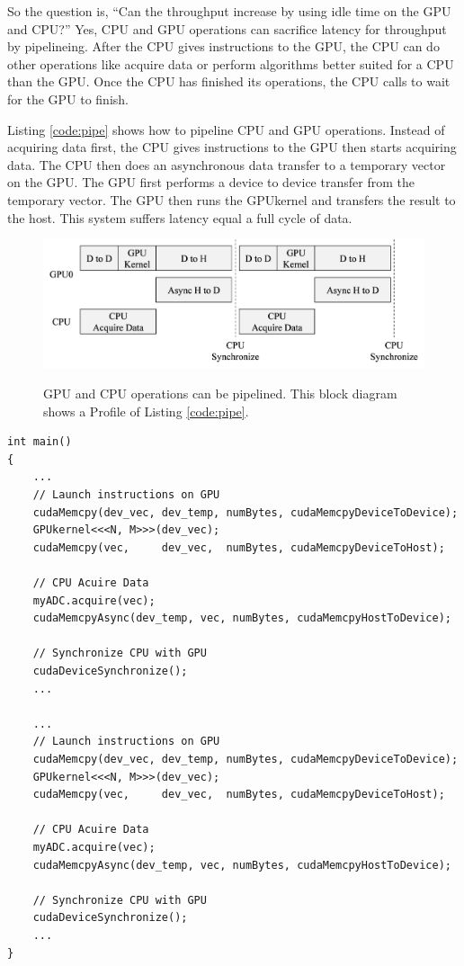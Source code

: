 So the question is, ``Can the throughput increase by using idle time on the GPU and CPU?''
Yes, CPU and GPU operations can sacrifice latency for throughput by pipelineing.
After the CPU gives instructions to the GPU, the CPU can do other operations like acquire data or perform algorithms better suited for a CPU than the GPU.
Once the CPU has finished its operations, the CPU calls to wait for the GPU to finish.

Listing \ref{code:pipe} shows how to pipeline CPU and GPU operations.
Instead of acquiring data first, the CPU gives instructions to the GPU then starts acquiring data.
The CPU then does an asynchronous data transfer to a temporary vector on the GPU.
The GPU first performs a device to device transfer from the temporary vector.
The GPU then runs the GPUkernel and transfers the result to the host.
This system suffers latency equal a full cycle of data.
\begin{figure}
	\caption{GPU and CPU operations can be pipelined. This block diagram shows a Profile of Listing \ref{code:pipe}.}
	\centering\includegraphics[width=9.97in/100*55]{figures/gpu_intro/concurrentCPU_blocking.pdf}
	\label{fig:concurrentCPU_blocking}
\end{figure}
\singlespacing
\begin{lstlisting}[style=myCUDAstyle,caption={Example code Simple of the CPU acquiring data from myADC, copying from host to device, processing data on the device then copying from device to host. No processing occurs on device while CPU is acquiring data.},label={code:pipe}]
int main()
{
	...
	// Launch instructions on GPU 
	cudaMemcpy(dev_vec, dev_temp, numBytes, cudaMemcpyDeviceToDevice);
	GPUkernel<<<N, M>>>(dev_vec);
	cudaMemcpy(vec,     dev_vec,  numBytes, cudaMemcpyDeviceToHost);
	
	// CPU Acuire Data
	myADC.acquire(vec);
	cudaMemcpyAsync(dev_temp, vec, numBytes, cudaMemcpyHostToDevice);
	
	// Synchronize CPU with GPU
	cudaDeviceSynchronize();
	...
	
	...
	// Launch instructions on GPU 
	cudaMemcpy(dev_vec, dev_temp, numBytes, cudaMemcpyDeviceToDevice);
	GPUkernel<<<N, M>>>(dev_vec);
	cudaMemcpy(vec,     dev_vec,  numBytes, cudaMemcpyDeviceToHost);
	
	// CPU Acuire Data
	myADC.acquire(vec);
	cudaMemcpyAsync(dev_temp, vec, numBytes, cudaMemcpyHostToDevice);
	
	// Synchronize CPU with GPU
	cudaDeviceSynchronize();
	...
}
\end{lstlisting}
\doublespacing


